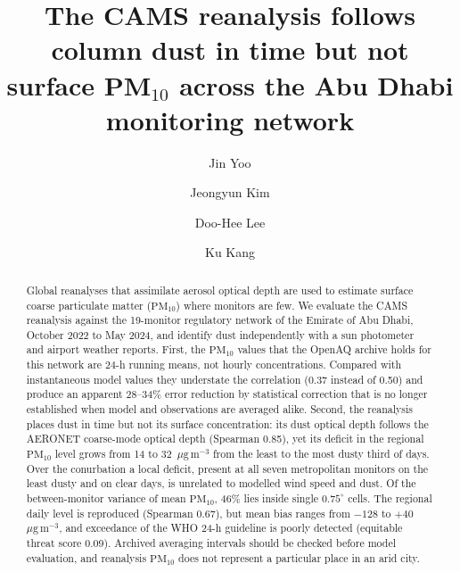 \documentclass[preprint,review,12pt,authoryear]{elsarticle}
\newcommand*{\ugm}{\ensuremath{\mu\mathrm{g\,m^{-3}}}}
\newcommand*{\pmten}{\ensuremath{\mathrm{PM_{10}}}}
\begin{document}
\begin{frontmatter}

\title{The CAMS reanalysis follows column dust in time but not surface PM$_{10}$ across the Abu Dhabi
monitoring network}

\author[cbrn]{Jin Yoo}
\author[snu]{Jeongyun Kim}
\author[kma]{Doo-Hee Lee}
\author[cbrn]{Ku Kang}



\begin{abstract}
Global reanalyses that assimilate aerosol optical depth are used to estimate surface
coarse particulate matter (\pmten{}) where monitors are few. We evaluate the CAMS reanalysis
against the 19-monitor regulatory network of the Emirate of Abu Dhabi, October 2022 to May 2024,
and identify dust independently with a sun photometer and airport weather reports. First, the \pmten{} values that the OpenAQ archive holds for this
network are 24-h running means, not hourly concentrations. Compared with instantaneous model
values they understate the correlation (0.37 instead of 0.50) and produce an apparent 28--34\%
error reduction by statistical correction that is no longer established when model and
observations are averaged alike. Second, the reanalysis places dust in time but not its surface concentration: its dust
optical depth follows the AERONET coarse-mode optical depth (Spearman 0.85), yet its deficit in
the regional \pmten{} level grows from 14 to 32~\ugm{} from the least to the most dusty third of
days. Over the conurbation a local deficit, present at all seven metropolitan monitors on
the least dusty and on clear days, is unrelated to modelled wind speed and dust.
Of the between-monitor variance of mean \pmten{}, 46\% lies inside single $0.75^{\circ}$ cells.
The regional daily level is reproduced (Spearman 0.67), but mean bias ranges from $-128$ to
$+40$~\ugm{}, and exceedance of the WHO 24-h guideline is poorly detected
(equitable threat score 0.09). Archived averaging intervals should be checked before model evaluation, and
reanalysis \pmten{} does not represent a particular place in an arid city.
\end{abstract}


\end{frontmatter}
\end{document}
